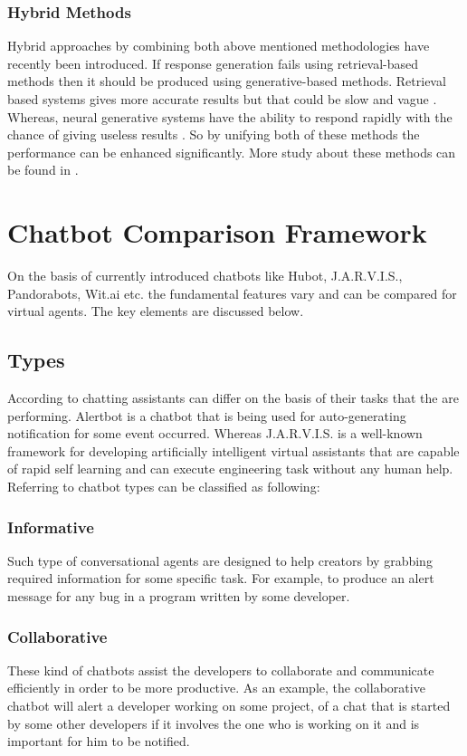 \subsubsection*{Hybrid Methods}
Hybrid approaches by combining both above mentioned methodologies have recently been introduced. If response generation fails using retrieval-based methods then it should be produced using generative-based methods. Retrieval based systems gives more accurate results but that could be slow and vague \cite{surveyondialogsystems}. Whereas, neural generative systems have the ability to respond rapidly with the chance of giving useless results \cite{surveyondialogsystems}. So by unifying both of these methods the performance can be enhanced significantly. More study about these methods can be found in \cite{generateifnotretrieve}.

\section{Chatbot Comparison Framework}
On the basis of currently introduced chatbots like Hubot, J.A.R.V.I.S., Pandorabots, Wit.ai etc. the fundamental features vary and can be compared for virtual agents. The key elements are discussed below.

\subsection{Types}
According to \cite{frameworkforunderstandingchatbots} chatting assistants can differ on the basis of their tasks that the are performing. Alertbot is a chatbot that is being used for auto-generating notification for some event occurred. Whereas J.A.R.V.I.S. is a well-known framework for developing artificially intelligent virtual assistants that are capable of rapid self learning and can execute engineering task without any human help. Referring to \cite{softwarebots} chatbot types can be classified as following: 

\subsubsection*{Informative}
Such type of conversational agents are designed to help creators by grabbing required information for some specific task. For example, to produce an alert message for any bug in a program written by some developer. 

\subsubsection*{Collaborative}
These kind of chatbots assist the developers to collaborate and communicate efficiently in order to be more productive. As an example, the collaborative chatbot will alert a developer working on some project, of a chat that is started by some other developers if it involves the one who is working on it and is important for him to be notified. 

